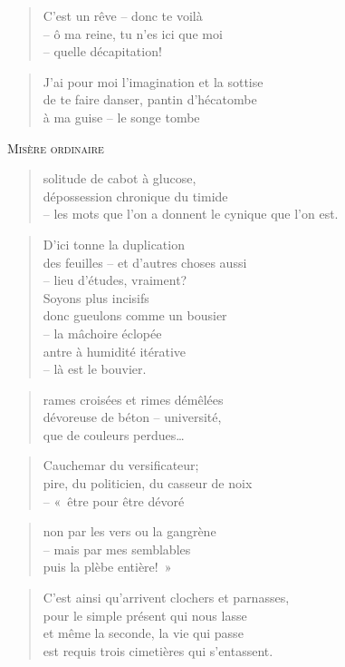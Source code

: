   \begin{verse}
    C’est un rêve -- donc te voilà\\
    -- ô ma reine, tu n’es ici que moi\\
    -- quelle décapitation!
  \end{verse}
  \begin{verse}
    J’ai pour moi l’imagination et la sottise\\
    de te faire danser, pantin d’hécatombe\\
    à ma guise -- le songe tombe
  \end{verse}
  \begin{center}
    \textsc{Misère ordinaire}
  \end{center}
  \begin{verse}
    solitude de cabot à glucose,\\
    dépossession chronique du timide\\
    -- les mots que l’on a donnent le cynique que l’on est.
  \end{verse}
  \begin{verse}
    D’ici tonne la duplication\\
    des feuilles -- et d’autres choses aussi\\
    -- lieu d’études, vraiment?\\
    Soyons plus incisifs\\
    donc gueulons comme un bousier\\
    -- la mâchoire éclopée\\
    antre à humidité itérative\\
    -- là est le bouvier.
  \end{verse}
  \begin{verse}
    rames croisées et rimes démêlées\\
    dévoreuse de béton -- université,\\
    que de couleurs perdues…
  \end{verse}
  \begin{verse}
    Cauchemar du versificateur;\\
    pire, du politicien, du casseur de noix\\
    -- «~être pour être dévoré
  \end{verse}
  \begin{verse}
    non par les vers ou la gangrène\\
    -- mais par mes semblables\\
    puis la plèbe entière!~»
  \end{verse}
  \begin{verse}
    C’est ainsi qu’arrivent clochers et parnasses,\\
    pour le simple présent qui nous lasse\\
    et même la seconde, la vie qui passe\\
    est requis trois cimetières qui s’entassent.
  \end{verse}
